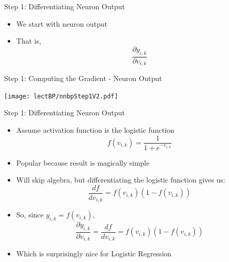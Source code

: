 \documentclass[aspectratio=169]{beamer}
\begin{document}
\begin{frame}{Step 1: Differentiating Neuron Output}

\begin{itemize}
        \item We start with neuron output
	\item That is, $$\frac{\partial y_{i,k}}{\partial v_{i,k}}$$
\end{itemize}
\end{frame}
\begin{frame}{Step 1: Computing the Gradient - Neuron Output}

\texttt{[image: lectBP/nnbpStep1V2.pdf]}
\end{frame}
\begin{frame}{Step 1:  Differentiating Neuron Output}

\begin{itemize}
	\item Assume activation function is the logistic function
	$$f(v_{i,k}) = \frac{1}{1 + e^{-v_{i,k}}}$$
	\item Popular because result is magically simple
	\item Will skip algebra, but differentiating the logistic function gives us:
	$$\frac{df}{dv_{i,k}} = f(v_{i,k})(1 - f(v_{i,k}))$$
	\item So, since $y_{i,k} = f(v_{i,k})$,
	$$\frac{\partial y_{i,k}}{\partial v_{i,k}} = \frac{df}{dv_{i,k}} = 
		f(v_{i,k})(1 - f(v_{i,k}))$$
	\item Which is surprisingly nice for Logistic Regression
\end{itemize}

\end{frame}
\end{document}
